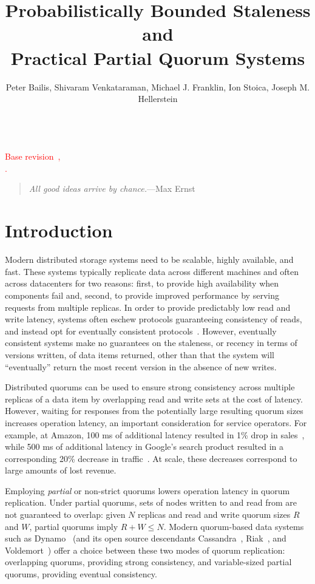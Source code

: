 \documentclass{vldb}
\title{Probabilistically Bounded Staleness and\\ Practical Partial Quorum Systems}
\author{Peter Bailis, Shivaram Venkataraman, Michael J. Franklin, Ion Stoica, Joseph M. Hellerstein\\
\affaddr{University of California, Berkeley}\\
\affaddr{\{pbailis, shivaram, franklin, stoica, hellerstein\}@cs.berkeley.edu}}
\begin{document}

\maketitle


\noindent\textcolor{red}{Base revision~\GITAbrHash,~\GITAuthorDate\\\GITAuthorName.}

\begin{quote}
\textit{All good ideas arrive by chance.}---Max Ernst
\end{quote}



\section{Introduction}

Modern distributed storage systems need to be scalable, highly
available, and fast.  These systems typically replicate data across
different machines and often across datacenters for two reasons:
first, to provide high availability when components fail and, second,
to provide improved performance by serving requests from multiple
replicas.  In order to provide predictably low read and write latency,
systems often eschew protocols guaranteeing consistency of reads, and
instead opt for eventually consistent protocols~\cite{vogels-def}.
However, eventually consistent systems make no guarantees on the
staleness, or recency in terms of versions written, of data items
returned, other than that the system will ``eventually'' return the
most recent version in the absence of new writes.

Distributed quorums can be used to ensure strong consistency across
multiple replicas of a data item by overlapping read and write sets at
the cost of latency. However, waiting for responses from the
potentially large resulting quorum sizes increases operation latency,
an important consideration for service operators. For example, at
Amazon, 100 ms of additional latency resulted in 1\% drop in
sales~\cite{amazon-latency}, while 500 ms of additional latency in
Google's search product resulted in a corresponding 20\% decrease in
traffic~\cite{google-talk}.  At scale, these decreases correspond to
large amounts of lost revenue.

Employing \textit{partial} or non-strict quorums lowers operation
latency in quorum replication.  Under partial quorums, sets of nodes
written to and read from are not guaranteed to overlap: given $N$
replicas and read and write quorum sizes $R$ and $W$, partial quorums
imply $R+W \leq N$.  Modern quorum-based data systems such as
Dynamo~\cite{dynamo} (and its open source descendants
Cassandra~\cite{cassandra}, Riak~\cite{riak}, and
Voldemort~\cite{voldemort}) offer a choice between these two modes of
quorum replication: overlapping quorums, providing strong consistency,
and variable-sized partial quorums, providing eventual consistency.
\end{document}
